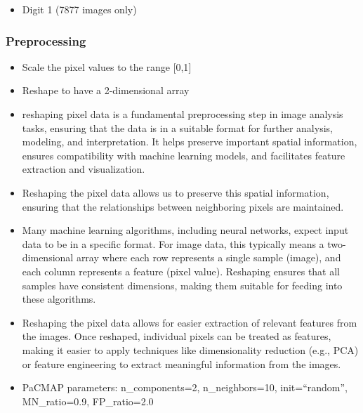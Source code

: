 \documentclass[
  12pt]{article}
\providecommand{\tightlist}{%
  \setlength{\itemsep}{0pt}\setlength{\parskip}{0pt}}\usepackage{longtable,booktabs,array}
\begin{document}
\begin{itemize}
\tightlist
\item
  Digit 1 (7877 images only)
\end{itemize}

\hypertarget{preprocessing}{%
\subsubsection{Preprocessing}\label{preprocessing}}

\begin{itemize}
\item
  Scale the pixel values to the range {[}0,1{]}
\item
  Reshape to have a 2-dimensional array
\item
  reshaping pixel data is a fundamental preprocessing step in image
  analysis tasks, ensuring that the data is in a suitable format for
  further analysis, modeling, and interpretation. It helps preserve
  important spatial information, ensures compatibility with machine
  learning models, and facilitates feature extraction and visualization.
\item
  Reshaping the pixel data allows us to preserve this spatial
  information, ensuring that the relationships between neighboring
  pixels are maintained.
\item
  Many machine learning algorithms, including neural networks, expect
  input data to be in a specific format. For image data, this typically
  means a two-dimensional array where each row represents a single
  sample (image), and each column represents a feature (pixel value).
  Reshaping ensures that all samples have consistent dimensions, making
  them suitable for feeding into these algorithms.
\item
  Reshaping the pixel data allows for easier extraction of relevant
  features from the images. Once reshaped, individual pixels can be
  treated as features, making it easier to apply techniques like
  dimensionality reduction (e.g., PCA) or feature engineering to extract
  meaningful information from the images.
\item
  PaCMAP parameters: n\_components=2, n\_neighbors=10, init=``random'',
  MN\_ratio=0.9, FP\_ratio=2.0
\end{itemize}
\end{document}
